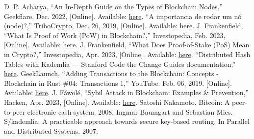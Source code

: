 \documentclass[conference]{IEEEtran}
\begin{document}
    \begin{thebibliography}{1}
         D. P. Acharya, “An In-Depth Guide on the Types of Blockchain Nodes,” Geekflare, Dec. 2022, [Online]. Available: \href{https://geekflare.com/blockchain-nodes-guide/}{here}.
         “A importancia de rodar um nó (node)?,” TriboCrypto, Dec. 26, 2019, [Online]. Available: \href{https://tribocrypto.com/t/a-importancia-de-rodar-um-no-node/830}{here}.
         J. Frankenfield, “What Is Proof of Work (PoW) in Blockchain?,” Investopedia, Feb. 2023, [Online]. Available: \href{https://www.investopedia.com/terms/p/proof-work.asp}{here}.
         J. Frankenfield, “What Does Proof-of-Stake (PoS) Mean in Crypto?,” Investopedia, Apr. 2023, [Online]. Available: \href{https://www.investopedia.com/terms/p/proof-stake-pos.asp}{here}.
         “Distributed Hash Tables with Kademlia — Stanford Code the Change Guides  documentation.” \href{https://codethechange.stanford.edu/guides/guide\_kademlia.html}{here}.
         GeekLaunch, “Adding Transactions to the Blockchain: Concepts - Blockchain in Rust \#04: Transactions 1,” YouTube. Feb. 06, 2019. [Online]. Available: \href{https://www.youtube.com/watch?v=-k1Yk9D\_lU4}{here}.
         J. Fáwolé, “Sybil Attack in Blockchain: Examples \& Prevention,” Hacken, Apr. 2023, [Online]. Available: \href{https://hacken.io/insights/sybil-attacks/}{here}.
         Satoshi Nakamoto. Bitcoin: A peer-to-peer electronic cash system. 2008.
         Ingmar Baumgart and Sebastian Mies. S/kademlia: A practicable approach towards secure key-based routing. In Parallel and Distributed Systems. 2007.
    \end{thebibliography}
\end{document}
